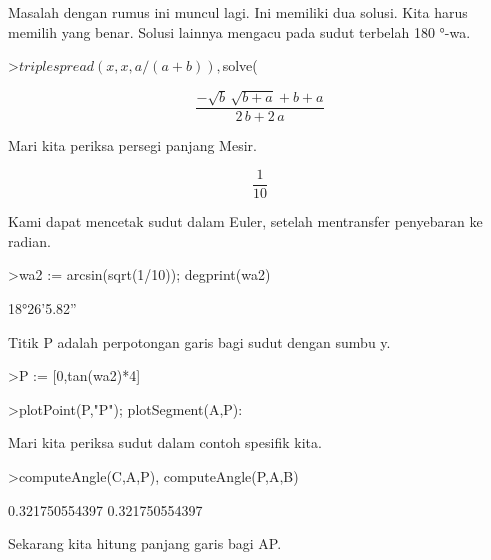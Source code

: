 \documentclass{article}
\begin{document}
\begin{eulernotebook}
\begin{eulercomment}
\begin{eulercomment}
\begin{eulercomment}
Masalah dengan rumus ini muncul lagi. Ini memiliki dua solusi. Kita
harus memilih yang benar. Solusi lainnya mengacu pada sudut terbelah
180 °-wa.
\end{eulercomment}
\begin{eulerprompt}
>$triplespread(x,x,a/(a+b)), $solve(%
\end{eulerprompt}
\begin{eulerformula}
\[
\frac{-\sqrt{b}\,\sqrt{b+a}+b+a}{2\,b+2\,a}
\]
\end{eulerformula}
\begin{eulercomment}
Mari kita periksa persegi panjang Mesir.
\end{eulercomment}
\begin{eulerformula}
\[
\frac{1}{10}
\]
\end{eulerformula}
\begin{eulercomment}
Kami dapat mencetak sudut dalam Euler, setelah mentransfer penyebaran
ke radian.
\end{eulercomment}
\begin{eulerprompt}
>wa2 := arcsin(sqrt(1/10)); degprint(wa2)
\end{eulerprompt}
\begin{euleroutput}
  18°26'5.82''
\end{euleroutput}
\begin{eulercomment}
Titik P adalah perpotongan garis bagi sudut dengan sumbu y.
\end{eulercomment}
\begin{eulerprompt}
>P := [0,tan(wa2)*4]
\end{eulerprompt}
\begin{euleroutput}
  [0,  1.33333]
\end{euleroutput}
\begin{eulerprompt}
>plotPoint(P,"P"); plotSegment(A,P):
\end{eulerprompt}
\begin{eulercomment}
Mari kita periksa sudut dalam contoh spesifik kita.
\end{eulercomment}
\begin{eulerprompt}
>computeAngle(C,A,P), computeAngle(P,A,B)
\end{eulerprompt}
\begin{euleroutput}
  0.321750554397
  0.321750554397
\end{euleroutput}
\begin{eulercomment}
Sekarang kita hitung panjang garis bagi AP.


\end{eulercomment}
\end{eulercomment}
\end{eulercomment}
\end{eulernotebook}
\end{document}
